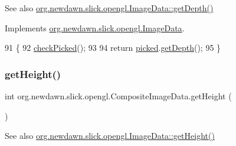 \begin{DoxySeeAlso}{See also}
\mbox{\hyperlink{interfaceorg_1_1newdawn_1_1slick_1_1opengl_1_1_image_data_a69be40348e05222e8f0c65f5845adcb9}{org.\+newdawn.\+slick.\+opengl.\+Image\+Data\+::get\+Depth()}} 
\end{DoxySeeAlso}


Implements \mbox{\hyperlink{interfaceorg_1_1newdawn_1_1slick_1_1opengl_1_1_image_data_a69be40348e05222e8f0c65f5845adcb9}{org.\+newdawn.\+slick.\+opengl.\+Image\+Data}}.


\begin{DoxyCode}
91                           \{
92         \mbox{\hyperlink{classorg_1_1newdawn_1_1slick_1_1opengl_1_1_composite_image_data_a1a95487f3cd09ae6bf1458ffa1d433b8}{checkPicked}}();
93         
94         \textcolor{keywordflow}{return} \mbox{\hyperlink{classorg_1_1newdawn_1_1slick_1_1opengl_1_1_composite_image_data_a7238cbb20cc08b68a29935b4bc222da7}{picked}}.\mbox{\hyperlink{interfaceorg_1_1newdawn_1_1slick_1_1opengl_1_1_image_data_a69be40348e05222e8f0c65f5845adcb9}{getDepth}}();
95     \}
\end{DoxyCode}
\mbox{\label{classorg_1_1newdawn_1_1slick_1_1opengl_1_1_composite_image_data_a4dbc5f72fe7bfb16716c631c8b12c5fb}} 
\subsubsection{\texorpdfstring{get\+Height()}{getHeight()}}
{\footnotesize\ttfamily int org.\+newdawn.\+slick.\+opengl.\+Composite\+Image\+Data.\+get\+Height (\begin{DoxyParamCaption}{ }\end{DoxyParamCaption})\hspace{0.3cm}{\ttfamily [inline]}}

\begin{DoxySeeAlso}{See also}
\mbox{\hyperlink{interfaceorg_1_1newdawn_1_1slick_1_1opengl_1_1_image_data_acce23925ae561e75f051d3287a8dda06}{org.\+newdawn.\+slick.\+opengl.\+Image\+Data\+::get\+Height()}} 
\end{DoxySeeAlso}


